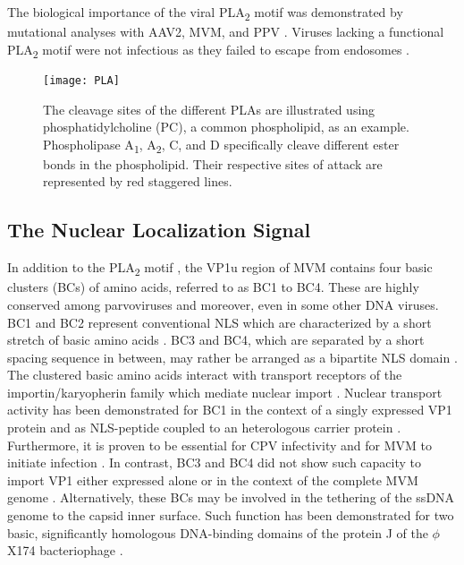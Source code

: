 The biological importance of the viral PLA\textsubscript{2} motif was demonstrated by mutational analyses with AAV2, MVM, and PPV \cite{pmid16284249, pmid11702787, pmid20974479}. Viruses lacking a functional PLA\textsubscript{2} motif were not infectious as they failed to escape from endosomes \cite{pmid16284249, pmid14644609,  pmid11799199, pmid11961250}.               

\begin{figure}[H]
\centering
  \texttt{[image: PLA]}
  \caption[The Cleavage Sites of Different Types of PLAs]
   {The cleavage sites of the different PLAs are illustrated using phosphatidylcholine (PC), a common phospholipid, as an example. Phospholipase A\textsubscript{1}, A\textsubscript{2}, C, and D specifically cleave different ester bonds in the phospholipid. Their respective sites of attack are represented by red staggered lines.} 
\label{PLA}
\end{figure}

\clearpage
\subsection{The Nuclear Localization Signal}
\label{NLS1}
In addition to the PLA\textsubscript{2} motif \cite{pmid11702787}, the VP1u region of MVM contains four basic clusters (BCs) of amino acids, referred to as BC1 to BC4. These are highly conserved among parvoviruses and moreover, even in some other DNA viruses. BC1 and BC2 represent conventional NLS which are characterized by a short stretch of basic amino acids \cite{pmid6096007, pmid6088992}. BC3 and BC4, which are separated by a short spacing sequence in between, may rather be arranged as a bipartite NLS domain \cite{pmid1991323}. The clustered basic amino acids interact with transport receptors of the importin/karyopherin family which mediate nuclear import \cite{pmid9126736, pmid9759490, pmid12067655}. Nuclear transport activity has been demonstrated for BC1 in the context of a singly expressed VP1 protein \cite{pmid12072505} and as NLS-peptide coupled to an heterologous carrier protein \cite{pmid9428689}. Furthermore, it is proven to be essential for CPV infectivity \cite{pmid11799183} and for MVM to initiate infection \cite{pmid12072505}. In contrast, BC3 and BC4 did not show such capacity to import VP1 either expressed alone \cite{pmid9428689} or in the context of the complete MVM genome \cite{pmid12072505}. Alternatively, these BCs may be involved in the tethering of the ssDNA genome to the capsid inner surface. Such function has been demonstrated for two basic, significantly homologous DNA-binding domains of the protein J of the $\phi$X174 bacteriophage \cite{pmid11991963}.

